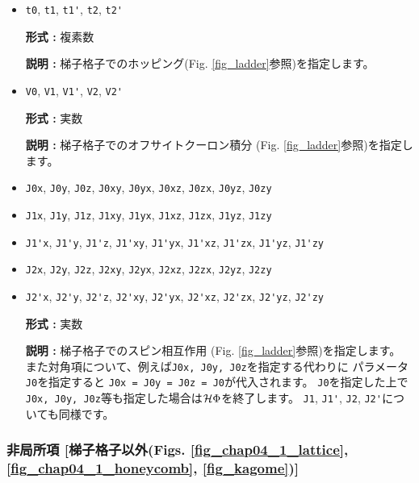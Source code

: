 \begin{itemize}
\item \verb|t0|,  \verb|t1|,  \verb|t1'|,  \verb|t2|,  \verb|t2'|

{\bf 形式 :} 複素数

{\bf 説明 :} 梯子格子でのホッピング(Fig. \ref{fig_ladder}参照)を指定します。

\item \verb|V0|,  \verb|V1|,  \verb|V1'|,  \verb|V2|,  \verb|V2'|

{\bf 形式 :} 実数

{\bf 説明 :} 梯子格子でのオフサイトクーロン積分
(Fig. \ref{fig_ladder}参照)を指定します。

\item \verb|J0x|, \verb|J0y|, \verb|J0z|, \verb|J0xy|, 
  \verb|J0yx|, \verb|J0xz|, \verb|J0zx|, \verb|J0yz|, \verb|J0zy|
\item \verb|J1x|, \verb|J1y|, \verb|J1z|, \verb|J1xy|, 
  \verb|J1yx|, \verb|J1xz|, \verb|J1zx|, \verb|J1yz|, \verb|J1zy|
\item \verb|J1'x|, \verb|J1'y|, \verb|J1'z|, \verb|J1'xy|, 
  \verb|J1'yx|, \verb|J1'xz|, \verb|J1'zx|, \verb|J1'yz|, \verb|J1'zy|
\item \verb|J2x|, \verb|J2y|, \verb|J2z|, \verb|J2xy|, 
  \verb|J2yx|, \verb|J2xz|, \verb|J2zx|, \verb|J2yz|, \verb|J2zy|
\item \verb|J2'x|, \verb|J2'y|, \verb|J2'z|, \verb|J2'xy|, 
  \verb|J2'yx|, \verb|J2'xz|, \verb|J2'zx|, \verb|J2'yz|, \verb|J2'zy|

{\bf 形式 :} 実数

{\bf 説明 :} 梯子格子でのスピン相互作用
(Fig. \ref{fig_ladder}参照)を指定します。
また対角項について、例えば\verb|J0x, J0y, J0z|を指定する代わりに
パラメータ\verb|J0|を指定すると
\verb|J0x = J0y = J0z = J0|が代入されます。
\verb|J0|を指定した上で\verb|J0x, J0y, J0z|等も指定した場合は$\mathcal{H} \Phi$を終了します。
\verb|J1|, \verb|J1'|, \verb|J2|, \verb|J2'|についても同様です。

\end{itemize}

\subsubsection{非局所項 [梯子格子以外(Figs. \ref{fig_chap04_1_lattice}, \ref{fig_chap04_1_honeycomb},
\ref{fig_kagome})]}

